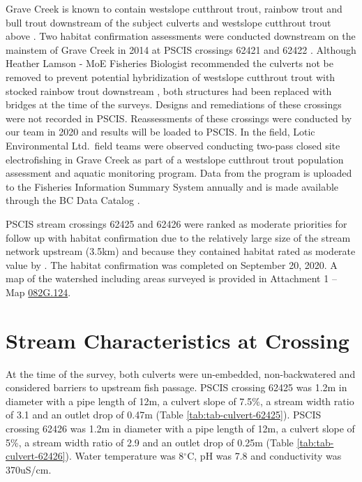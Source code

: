 \documentclass[
]{book}
\begin{document}
Grave Creek is known to contain westslope cutthrout trout, rainbow trout and bull trout downstream of the subject culverts and westslope cutthrout trout above \citep{data_fish_obs}. Two habitat confirmation assessments were conducted downstream on the mainstem of Grave Creek in 2014 at PSCIS crossings 62421 and 62422 \citep{masseEKConfirmation2015}. Although Heather Lamson - MoE Fisheries Biologist recommended the culverts not be removed to prevent potential hybridization of westslope cutthrout trout with stocked rainbow trout downstream \citep{masseEKConfirmation2015}, both structures had been replaced with bridges at the time of the surveys. Designs and remediations of these crossings were not recorded in PSCIS. Reassessments of these crossings were conducted by our team in 2020 and results will be loaded to PSCIS. In the field, Lotic Environmental Ltd.~field teams were observed conducting two-pass closed site electrofishing in Grave Creek as part of a westslope cutthrout trout population assessment and aquatic monitoring program. Data from the program is uploaded to the Fisheries Information Summary System annually and is made available through the BC Data Catalog \citep{data_fish_obs, moeStreamInventorySample}.

PSCIS stream crossings 62425 and 62426 were ranked as moderate priorities for follow up with habitat confirmation due to the relatively large size of the stream network upstream (3.5km) and because they contained habitat rated as moderate value by \citet{vastFishPassage2013}. The habitat confirmation was completed on September 20, 2020. A map of the watershed including areas surveyed is provided in Attachment 1 -- Map \href{https://hillcrestgeo.ca/outgoing/fishpassage/projects/elk/FishPassage_082G.124.pdf}{082G.124}.

\hypertarget{stream-characteristics-at-crossing-4}{%
\section*{Stream Characteristics at Crossing}\label{stream-characteristics-at-crossing-4}}

At the time of the survey, both culverts were un-embedded, non-backwatered and considered barriers to upstream fish passage. PSCIS crossing 62425 was 1.2m in diameter with a pipe length of 12m, a culvert slope of 7.5\%, a stream width ratio of 3.1 and an outlet drop of 0.47m (Table \ref{tab:tab-culvert-62425}). PSCIS crossing 62426 was 1.2m in diameter with a pipe length of 12m, a culvert slope of 5\%, a stream width ratio of 2.9 and an outlet drop of 0.25m (Table \ref{tab:tab-culvert-62426}). Water temperature was 8\(^\circ\)C, pH was 7.8 and conductivity was 370uS/cm.
\end{document}
